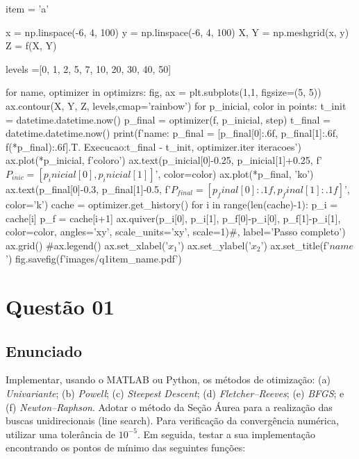 \documentclass[10pt, a4paper]{article}
\begin{document}
\begin{python}
item = 'a'

x = np.linspace(-6, 4, 100)
y = np.linspace(-6, 4, 100)
X, Y = np.meshgrid(x, y)
Z = f(X, Y)

levels =[0, 1, 2, 5, 7, 10, 20, 30, 40, 50]

for name, optimizer in optimizrs:
    fig, ax = plt.subplots(1,1, figsize=(5, 5))
    ax.contour(X, Y, Z, levels,cmap='rainbow')
    for p_inicial, color in points:
        t_init = datetime.datetime.now()
        p_final = optimizer(f, p_inicial, step)
        t_final = datetime.datetime.now()
        print(f'{name}: p_final = [{p_final[0]:.6f}, {p_final[1]:.6f}, {f(*p_final):.6f}].T. Execucao:{t_final - t_init}, {optimizer.iter} iteracoes')
        ax.plot(*p_inicial, f'{color}o')
        ax.text(p_inicial[0]-0.25, p_inicial[1]+0.25, f'$P_{{inic}} = [{p_inicial[0]}, {p_inicial[1]}]$', color=color)
        ax.plot(*p_final, 'ko')
        ax.text(p_final[0]-0.3, p_final[1]-0.5, f'$P_{{final}} = [{p_final[0]:.1f}, {p_final[1]:.1f}]$', color='k')
        cache = optimizer.get_history()
        for i in range(len(cache)-1):
            p_i = cache[i]
            p_f = cache[i+1]
            ax.quiver(p_i[0], p_i[1], p_f[0]-p_i[0], p_f[1]-p_i[1], color=color, angles='xy', scale_units='xy', scale=1)#, label='Passo completo')
    ax.grid()
    #ax.legend()
    ax.set_xlabel('$x_1$')
    ax.set_ylabel('$x_2$')
    ax.set_title(f'${name}$')
    fig.savefig(f'images/q1{item}_{name}.pdf')
\end{python}

\section{Questão 01}\label{sec:q01}

\subsection{Enunciado}

Implementar, usando o MATLAB ou Python, os métodos de otimização: (a) \textit{Univariante}; (b) \textit{Powell}; (c) \textit{Steepest Descent}; 
(d) \textit{Fletcher–Reeves}; (e) \textit{BFGS}; e (f) \textit{Newton–Raphson}. Adotar o método da Seção Áurea para a realização das buscas unidirecionais
(line search). Para verificação da convergência numérica, utilizar uma tolerância de $10^{-5}$. Em seguida, testar a sua implementação encontrando os pontos
de mínimo das seguintes funções:
\end{document}
